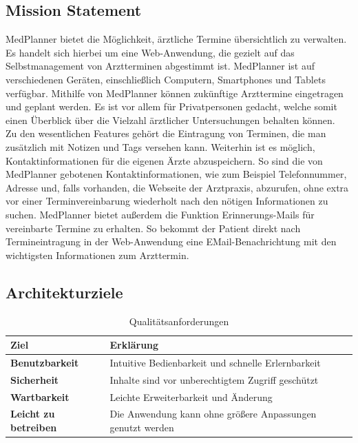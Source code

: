 \documentclass[conference]{IEEEtran}
\begin{document}
\subsection{Mission Statement}
MedPlanner bietet die Möglichkeit, ärztliche Termine übersichtlich zu verwalten. Es handelt sich hierbei um eine Web-Anwendung, die gezielt auf das Selbstmanagement von Arztterminen abgestimmt ist. MedPlanner ist auf verschiedenen Geräten, einschließlich Computern, Smartphones und Tablets verfügbar. Mithilfe von MedPlanner können zukünftige Arzttermine eingetragen und geplant werden. Es ist vor allem für Privatpersonen gedacht, welche somit einen Überblick über die Vielzahl ärztlicher Untersuchungen behalten können.\\
Zu den wesentlichen Features gehört die Eintragung von Terminen, die man zusätzlich mit Notizen und Tags versehen kann. Weiterhin ist es möglich, Kontaktinformationen für die eigenen Ärzte abzuspeichern. So sind die von MedPlanner gebotenen Kontaktinformationen, wie zum Beispiel Telefonnummer, Adresse und, falls vorhanden, die Webseite der Arztpraxis, abzurufen, ohne extra vor einer Terminvereinbarung wiederholt nach den nötigen Informationen zu suchen. MedPlanner bietet außerdem die Funktion Erinnerungs-Mails für vereinbarte Termine zu erhalten. So bekommt der Patient direkt nach Termineintragung in der Web-Anwendung eine EMail-Benachrichtung mit den wichtigsten Informationen zum Arzttermin.


\subsection{Architekturziele}
\begin{table}[!h]
	\caption{Qualitätsanforderungen}
	\begin{tabularx}{\columnwidth}{>{\bfseries}l|p{57mm}}
		\toprule
		\textbf{Ziel} & Erklärung\\
		\midrule
		Benutzbarkeit & Intuitive Bedienbarkeit und schnelle Erlernbarkeit\\
		Sicherheit & Inhalte sind vor unberechtigtem Zugriff geschützt\\
		Wartbarkeit & Leichte Erweiterbarkeit und Änderung\\
		Leicht zu betreiben & Die Anwendung kann ohne größere Anpassungen genutzt werden\\
		\bottomrule
	\end{tabularx}
\end{table}
\pagebreak
\end{document}
